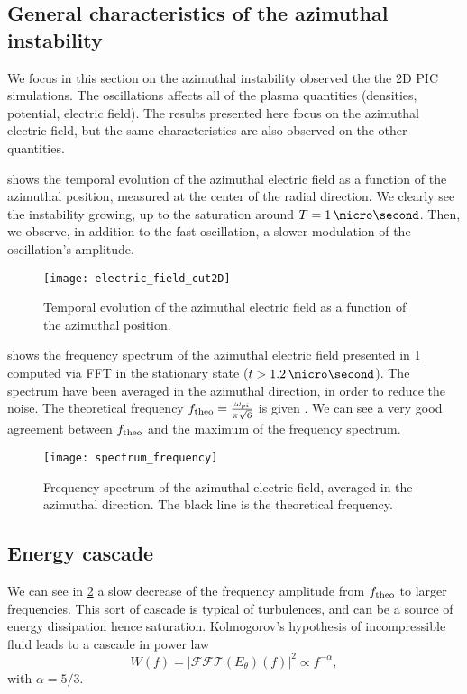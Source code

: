   \subsection{General characteristics of the azimuthal instability }
  
  We focus in this section on the azimuthal instability observed the the \ac{2D} \ac{PIC} simulations.
  The oscillations affects all of the plasma quantities (densities, potential, electric field).
  The results presented here focus on the azimuthal electric field, but the same characteristics are also observed on the other quantities.
  
   shows the temporal evolution of the azimuthal electric field as a function of the azimuthal position, measured at the center of the radial direction.
  We clearly see the instability growing, up to the saturation around $T=1\,\micro\second$.
  Then, we observe, in addition to the fast oscillation, a slower modulation of the oscillation's amplitude. 
  \begin{figure}[hbtp]
    \centering
    \texttt{[image: electric\_field\_cut2D]}
    \caption{Temporal evolution of the azimuthal electric field as a function of the azimuthal position.}
    \label{fig-2DcutEx}
  \end{figure}

   shows the frequency spectrum of the azimuthal electric field presented in \cref{fig-2DcutEx} computed via \ac{FFT} in the stationary state ($t > 1.2\,\micro\second$).
  The spectrum have been averaged in the azimuthal direction, in order to reduce the noise.
  The theoretical frequency $f_{\rm theo} = \frac{\omega_{pi}}{\pi \sqrt{6} }$ is given \citep{croes2018}. 
  We can see a very good agreement between $f_{\rm theo}$ and the maximum of the frequency spectrum.
  \begin{figure}[hbtp]
    \centering
    \texttt{[image: spectrum\_frequency]}
    \caption{Frequency spectrum of the azimuthal electric field, averaged in the azimuthal direction. The black line is the theoretical frequency.}
    \label{fig-FFT_ex}
  \end{figure}
  
  \subsection{Energy cascade} \label{subsec-turbul}
  
  We can see in \cref{fig-FFT_ex} a slow decrease of the frequency amplitude from $f_{\rm theo}$ to larger frequencies.
  This sort of cascade is typical of turbulences, and can be a source of energy dissipation hence saturation.
  Kolmogorov's hypothesis of incompressible fluid leads to a cascade in power law \[ W(f) = | \mathcal{FFT}(E_{\theta})(f) |^2 \propto f ^ {- \alpha}, \]
  with $\alpha = 5/3$.
  

